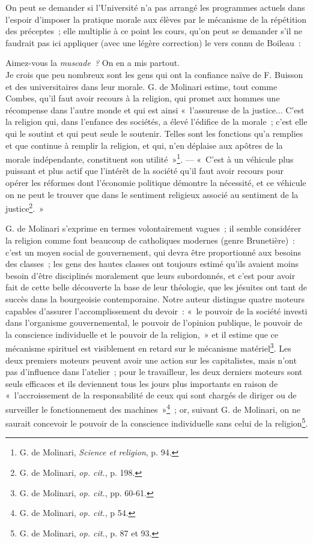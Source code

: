\documentclass[french,twoside]{book} %
\begin{document}
On peut se demander si l’Université n’a pas arrangé les programmes actuels dans l’espoir d’imposer la pratique morale aux élèves par le mécanisme de la répétition des préceptes ; elle multiplie à ce point les cours, qu’on peut se demander s’il ne faudrait pas ici appliquer (avec une légère correction) le vers connu de Boileau :\par

Aimez-vous la \emph{muscade ?} On en a mis partout.\\

\noindent Je crois que peu nombreux sont les gens qui ont la confiance naïve de F. Buisson et des universitaires dans leur morale. G. de Molinari estime, tout comme Combes, qu’il faut avoir recours à la religion, qui promet aux hommes une récompense dans l’autre monde et qui est ainsi « l’assureuse de la justice... C’est la religion qui, dans l’enfance des sociétés, a élevé l’édifice de la morale ; c’est elle qui le soutint et qui peut seule le soutenir. Telles sont les fonctions qu’a remplies et que continue à remplir la religion, et qui, n’en déplaise aux apôtres de la morale indépendante, constituent son utilité »\footnote{ \noindent G. de Molinari, \emph{Science et religion}, p. 94.
 }. — « C’est à un véhicule plus puissant et plus actif que l’intérêt de la société qu’il faut avoir recours pour opérer les réformes dont l’économie politique démontre la nécessité, et ce véhicule on ne peut le trouver que dans le sentiment religieux associé au sentiment de la justice\footnote{ \noindent G. de Molinari, \emph{op. cit.}, p. 198.
 }. »\par
G. de Molinari s’exprime en termes volontairement vagues ; il semble considérer la religion comme font beaucoup  de catholiques modernes (genre Brunetière) : c’est un moyen social de gouvernement, qui devra être proportionné aux besoins des classes ; les gens des hautes classes ont toujours estimé qu’ils avaient moins besoin d’être disciplinés moralement que leurs subordonnés, et c’est pour avoir fait de cette belle découverte la base de leur théologie, que les jésuites ont tant de succès dans la bourgeoisie contemporaine. Notre auteur distingue quatre moteurs capables d’assurer l’accomplissement du devoir : « le pouvoir de la société investi dans l’organisme gouvernemental, le pouvoir de l’opinion publique, le pouvoir de la conscience individuelle et le pouvoir de la religion, » et il estime que ce mécanisme spirituel est visiblement en retard sur le mécanisme matériel\footnote{ \noindent G. de Molinari, \emph{op. cit.}, pp. 60-61.
 }. Les deux premiers moteurs peuvent avoir une action sur les capitalistes, mais n’ont pas d’influence dans l’atelier ; pour le travailleur, les deux derniers moteurs sont seuls efficaces et ils deviennent tous les jours plus importants en raison de « l’accroissement de la responsabilité de ceux qui sont chargés de diriger ou de surveiller le fonctionnement des machines »\footnote{ \noindent G. de Molinari, \emph{op. cit.}, p 54.
 } ; or, suivant G. de Molinari, on ne saurait concevoir le pouvoir de la conscience individuelle sans celui de la religion\footnote{ \noindent G. de Molinari, \emph{op. cit.}, p. 87 et 93.
 }.\par
\end{document}
